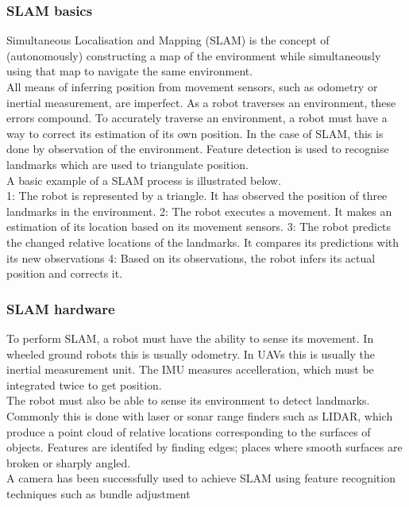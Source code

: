 \documentclass{article}
\begin{document}
	\subsubsection{SLAM basics}
	Simultaneous Localisation and Mapping (SLAM) is the concept of (autonomously) constructing a map of the environment while simultaneously using that map to navigate the same environment. 
	\\All means of inferring position from movement sensors, such as odometry or inertial measurement, are imperfect. As a robot traverses an environment, these errors compound. To accurately traverse an environment, a robot must have a way to correct its estimation of its own position. In the case of SLAM, this is done by observation of the environment. Feature detection is used to recognise landmarks which are used to triangulate position\cite{Blas}.
	\\A basic example of a SLAM process is illustrated below. 
	\\1: The robot is represented by a triangle. It has observed the position of three landmarks in the environment.
	2: The robot executes a movement. It makes an estimation of its location based on its movement sensors.
	3: The robot predicts the changed relative locations of the landmarks. It compares its predictions with its new observations
	4: Based on its observations, the robot infers its actual position and corrects it.
	
		\subsubsection{SLAM hardware}
		To perform SLAM, a robot must have the ability to sense its movement. In wheeled ground robots this is usually odometry. In UAVs this is usually the inertial measurement unit. The IMU measures accelleration, which must be integrated twice to get position\cite{kim2007real}.
		\\The robot must also be able to sense its environment to detect landmarks. Commonly this is done with laser or sonar range finders such as LIDAR, which produce a point cloud of relative locations corresponding to the surfaces of objects. Features are identifed by finding edges; places where smooth surfaces are broken or sharply angled.
		\\A camera has been successfully used to achieve SLAM using feature recognition techniques such as bundle adjustment%
		
\end{document}
